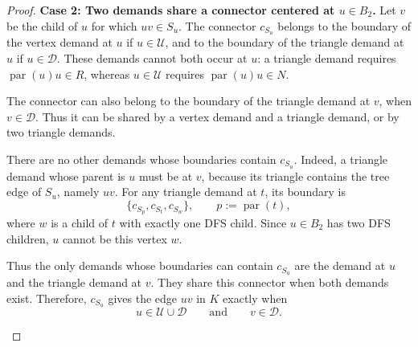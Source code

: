 \documentclass[11pt]{amsart}
\newcommand{\1}{\mathbbm{1}}
\begin{document}
\begin{proof}
\smallskip\noindent
\textbf{Case 2: Two demands share a connector centered at $u\in B_2$.}
Let $v$ be the child of $u$ for which $uv\in S_u$.
The connector $c_{S_u}$ belongs to the boundary of the
vertex demand at $u$ if $u\in\mathcal U$, and to the boundary
of the triangle demand at $u$ if $u\in\mathcal D$.
These demands cannot both occur at $u$: a triangle demand
requires $\operatorname{par}(u)u\in R$, whereas
$u\in\mathcal U$ requires $\operatorname{par}(u)u\in N$.

The connector can also belong to the boundary of the
triangle demand at $v$, when $v\in\mathcal D$.
Thus it can be shared by a vertex demand and a triangle
demand, or by two triangle demands.

There are no other demands whose boundaries contain
$c_{S_u}$. Indeed, a triangle demand whose parent is $u$
must be at $v$, because its triangle contains the tree
edge of $S_u$, namely $uv$.
For any triangle demand at $t$, its boundary is
\[
 \{c_{S_p},c_{S_t},c_{S_w}\},
 \qquad p:=\operatorname{par}(t),
\]
where $w$ is a child of $t$ with exactly one DFS child.
Since $u\in B_2$ has two DFS children, $u$ cannot be
this vertex $w$.

Thus the only demands whose boundaries can contain
$c_{S_u}$ are the demand at $u$ and the triangle demand
at $v$. They share this connector when both demands exist.
Therefore, $c_{S_u}$ gives the edge $uv$ in $K$ exactly when
\[
 u\in\mathcal U\cup\mathcal D
 \qquad\text{and}\qquad v\in\mathcal D.
\]

\begin{figure}[H]
\centering
\begin{subfigure}[t]{.48\textwidth}
\centering
{}
\end{subfigure}
\end{figure}
\end{proof}
\end{document}
